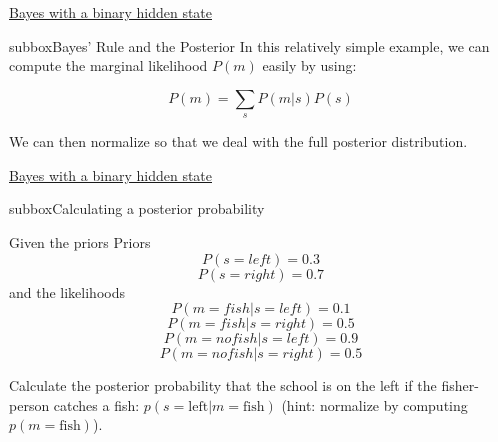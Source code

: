 \begin{textbox}{\href{https://compneuro.neuromatch.io/tutorials/W3D1_BayesianDecisions/student/W3D1_Tutorial1.html}{Bayes with a binary hidden state } }
\begin{subbox}{subbox}{Bayes' Rule and the Posterior}
In this relatively simple example, we can compute the marginal likelihood $P(m)$ easily by using:

\begin{equation}
P(m) = \sum_s P(m | s) P(s)
\end{equation}

We can then normalize so that we deal with the full posterior distribution.
 
\end{subbox}

\end{textbox}


\begin{textbox}{\href{https://compneuro.neuromatch.io/tutorials/W3D1_BayesianDecisions/student/W3D1_Tutorial1.html}{Bayes with a binary hidden state } }
\begin{subbox}{subbox}{Calculating a posterior probability
}
\scriptsize

Given the priors
Priors
$$P(s = left) = 0.3$$
$$P(s = right) = 0.7$$
and the likelihoods
$$P(m = fish | s = left) = 0.1$$
$$P(m = fish | s = right) = 0.5$$
$$P(m = no fish | s = left) = 0.9$$
$$P(m = no fish | s = right) = 0.5$$

Calculate the posterior probability that the school is on the left if the fisher-person catches a fish: $p(s = \textrm{left} | m = \textrm{fish})$ (hint: normalize by computing $p(m = \textrm{fish})$).


\end{subbox}
\end{textbox}
